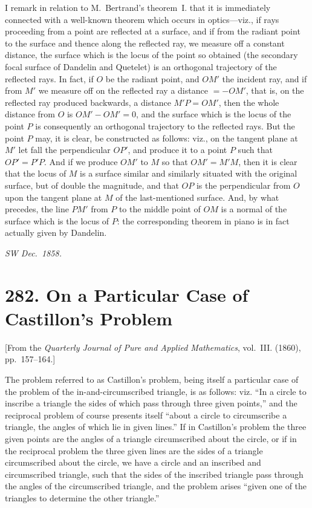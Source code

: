 \documentclass[11pt,a4paper]{book}
\begin{document}
I remark in relation to M.~Bertrand's theorem~I. that it is immediately connected with a well-known theorem which occurs in optics---viz., if rays proceeding from a point are reflected at a surface, and if from the radiant point to the surface and thence along the reflected ray, we measure off a constant distance, the surface which is the locus of the point so obtained (the secondary focal surface of Dandelin and Quetelet) is an orthogonal trajectory of the reflected rays. In fact, if $O$ be the radiant point, and $OM'$ the incident ray, and if from $M'$ we measure off on the reflected ray a distance $= -OM'$, that is, on the reflected ray produced backwards, a distance $M'P = OM'$, then the whole distance from $O$ is $OM' - OM' = 0$, and the surface which is the locus of the point $P$ is consequently an orthogonal trajectory to the reflected rays. But the point $P$ may, it is clear, be constructed as follows: viz., on the tangent plane at $M'$ let fall the perpendicular $OP'$, and produce it to a point $P$ such that $OP' = P'P$. And if we produce $OM'$ to $M$ so that $OM' = M'M$, then it is clear that the locus of $M$ is a surface similar and similarly situated with the original surface, but of double the magnitude, and that $OP$ is the perpendicular from $O$ upon the tangent plane at $M$ of the last-mentioned surface. And, by what precedes, the line $PM'$ from $P$ to the middle point of $OM$ is a normal of the surface which is the locus of $P$: the corresponding theorem in piano is in fact actually given by Dandelin.

\hfill\textit{SW Dec.~1858.}


\newpage
\section*{282. On a Particular Case of Castillon's Problem}
\label{sec:282}

[From the \textit{Quarterly Journal of Pure and Applied Mathematics}, vol.~III. (1860), pp.~157--164.]

The problem referred to as Castillon's problem, being itself a particular case of the problem of the in-and-circumscribed triangle, is as follows: viz. ``In a circle to inscribe a triangle the sides of which pass through three given points,'' and the reciprocal problem of course presents itself ``about a circle to circumscribe a triangle, the angles of which lie in given lines.'' If in Castillon's problem the three given points are the angles of a triangle circumscribed about the circle, or if in the reciprocal problem the three given lines are the sides of a triangle circumscribed about the circle, we have a circle and an inscribed and circumscribed triangle, such that the sides of the inscribed triangle pass through the angles of the circumscribed triangle, and the problem arises ``given one of the triangles to determine the other triangle.''
\end{document}
